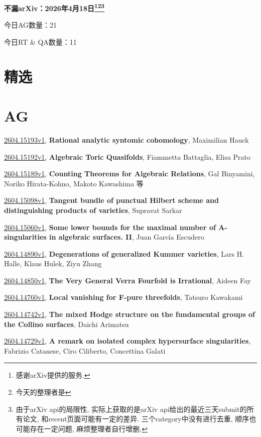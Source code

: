 \documentclass[9pt, a4paper]{article}
\theoremstyle{plain}
\theoremstyle{definition}
\theoremstyle{remark}
\newcommand{\arxiv}[3]{\href{https://arxiv.org/abs/#1}{#1}, \textbf{\textcolor{arxivblue}{#2}}, #3}
\newcommand{\AGnumber}{21}
\newcommand{\RTQAnumber}{11}
\newcommand{\NewestDate}{2026年4月18日}
\newcommand{\todayarXiver}{} %
\begin{document}
\begin{center}
    \Huge\textbf{不漏arXiv：\NewestDate\footnote{感谢arXiv提供的服务.}\footnote{今天的整理者是\todayarXiver}\footnote{由于arXiv api的局限性, 实际上获取的是arXiv api给出的最近三天submit的所有论文, 和recent页面可能有一定的差异. 三个category中没有进行去重, 顺序也可能存在一定问题, 麻烦整理者自行增删.}} \\
\end{center}

\setcounter{section}{-1}

\begin{center}
    今日AG数量：\AGnumber
    
    今日RT \& QA数量：\RTQAnumber
    
\end{center}


\section{精选}


\section{AG}
\arxiv{2604.15193v1}{Rational analytic syntomic cohomology}{Maximilian Hauck}

\arxiv{2604.15192v1}{Algebraic Toric Quasifolds}{Fiammetta Battaglia, Elisa Prato}

\arxiv{2604.15189v1}{Counting Theorems for Algebraic Relations}{Gal Binyamini, Noriko Hirata-Kohno, Makoto Kawashima 等}

\arxiv{2604.15098v1}{Tangent bundle of punctual Hilbert scheme and distinguishing products of varieties}{Supravat Sarkar}

\arxiv{2604.15060v1}{Some lower bounds for the maximal number of A-singularities in algebraic surfaces. II}{Juan García Escudero}

\arxiv{2604.14890v1}{Degenerations of generalized Kummer varieties}{Lars H. Halle, Klaus Hulek, Ziyu Zhang}

\arxiv{2604.14850v1}{The Very General Verra Fourfold is Irrational}{Aideen Fay}

\arxiv{2604.14760v1}{Local vanishing for F-pure threefolds}{Tatsuro Kawakami}

\arxiv{2604.14742v1}{The mixed Hodge structure on the fundamental groups of the Collino surfaces}{Daichi Arimatsu}

\arxiv{2604.14729v1}{A remark on isolated complex hypersurface singularities}{Fabrizio Catanese, Ciro Ciliberto, Concettina Galati}
\end{document}
